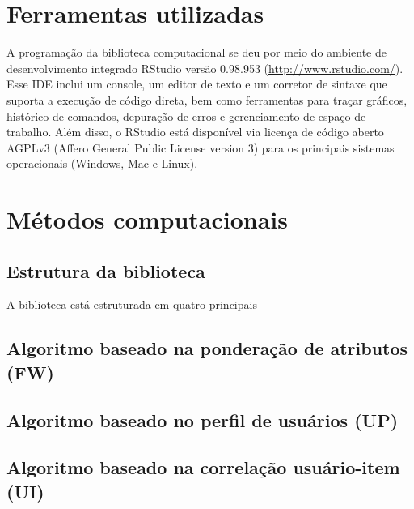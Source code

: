 \section{Ferramentas utilizadas} %
\label{sec:ferramentas_utilizadas}

A programação da biblioteca computacional se deu por meio do ambiente de desenvolvimento integrado RStudio versão 0.98.953 (\url{http://www.rstudio.com/}). Esse IDE inclui um console, um editor de texto e um corretor de sintaxe que suporta a execução de código direta, bem como ferramentas para traçar gráficos, histórico de comandos, depuração de erros e gerenciamento de espaço de trabalho. Além disso, o RStudio está disponível via licença de código aberto AGPLv3 (Affero General Public License version 3) para os principais sistemas operacionais (Windows, Mac e Linux).

\section{Métodos computacionais} %
\label{sec:m_todos_computacionais}

\subsection{Estrutura da biblioteca} %
\label{sub:estrutura_da_biblioteca}

A biblioteca está estruturada em quatro principais 


\subsection{Algoritmo baseado na ponderação de atributos (FW)} %
\label{sub:algoritmo_baseado_na_pondera_o_de_atributos_fw_}
\subsection{Algoritmo baseado no perfil de usuários (UP)} %
\label{sub:algoritmo_baseado_no_perfil_de_usu_rios_up_}
\subsection{Algoritmo baseado na correlação usuário-item (UI)} %
\label{sub:algoritmo_baseado_na_correla_o_usu_rio_item_ui_}


